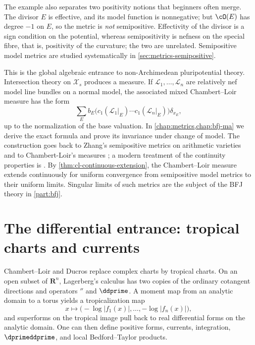The example also separates two positivity notions that beginners often
merge.  The divisor $E$ is effective, and its model function is nonnegative;
but $\cO(E)$ has degree $-1$ on $E$, so the metric is \emph{not}
semipositive.  Effectivity of the divisor is a sign condition on the
potential, whereas semipositivity is nefness on the special fibre, that is,
positivity of the curvature; the two are unrelated.  Semipositive model
metrics are studied systematically in \cref{sec:metrics-semipositive}.

This is the global algebraic entrance to non-Archimedean pluripotential
theory.  Intersection theory on $\mathcal X_s$ produces a measure.  If
$\mathcal L_1,\ldots,\mathcal L_n$ are relatively nef model line bundles on
a normal model, the associated mixed Chambert--Loir measure has the form
\[
 \sum_E b_E
   \bigl(c_1(\mathcal L_1|_E)\cdots c_1(\mathcal L_n|_E)\bigr)
   \delta_{x_E},
\]
up to the normalization of the base valuation.  In
\cref{chap:metrics,chap:bfj-ma} we
derive the exact formula and prove its invariance under change of model.
The construction goes back to Zhang's semipositive metrics on arithmetic
varieties \cite{Zhang1995} and to Chambert-Loir's measures \cite{CL06}; a
modern treatment of the continuity properties is \cite{GM19}.  By
\cref{thm:cl-continuous-extension}, the Chambert--Loir measure extends
continuously for uniform convergence from semipositive model metrics to their
uniform limits.  Singular limits of such metrics are the subject of the BFJ
theory in \cref{part:bfj}.

\section{The differential entrance: tropical charts and currents}
\label{sec:ch01-differential-entrance}

Chambert--Loir and Ducros replace complex charts by tropical charts.  On an
open subset of $\mathbf R^n$, Lagerberg's calculus has two copies of the
ordinary cotangent directions and operators $\dprime$ and $\ddprime$.  A moment map
from an analytic domain to a torus yields a tropicalization map
\[
                     x\longmapsto
       \bigl(-\log|f_1(x)|,\ldots,-\log|f_n(x)|\bigr),
\]
and superforms on the tropical image pull back to real differential forms on
the analytic domain.  One can then define positive forms, currents,
integration, $\dprimeddprime$, and local Bedford--Taylor products.

